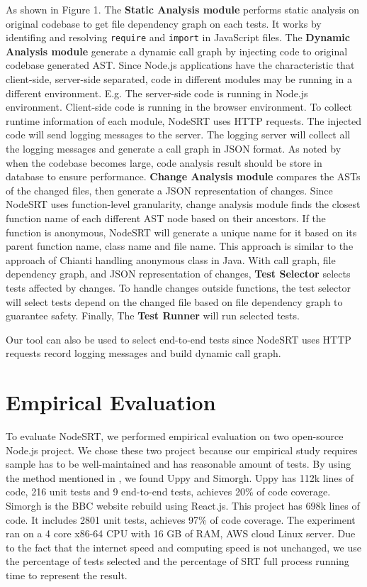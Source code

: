\documentclass[10pt, conference]{IEEEtran}
\begin{document}
As shown in Figure 1. The \textbf{Static Analysis module} performs static analysis on original codebase to get file dependency
graph on each tests. It works by identifing and resolving \verb|require| and \verb|import| in JavaScript files. The \textbf{Dynamic Analysis module} generate a dynamic call graph by injecting code to original codebase 
generated AST. Since Node.js applications have the characteristic that client-side, server-side separated, code in 
different modules may be running in a different environment. E.g. The server-side code is running in Node.js 
environment. Client-side code is running in the browser environment. To collect runtime information of each 
module, NodeSRT uses HTTP requests. The injected code will send logging messages to the server. The logging server will 
collect all the logging messages and generate a call graph in JSON format. As noted by \cite{b2, b4} when the codebase 
becomes large, code analysis result should be store in database to ensure performance. \textbf{Change Analysis module} 
compares the ASTs of the changed files, then generate a JSON representation of changes. Since NodeSRT uses function-level 
granularity, change analysis module finds the closest function name of each different AST node based on their ancestors. 
If the function is anonymous, NodeSRT will generate a unique name for it based on its parent function name, class name and file name. 
This approach is similar to the approach of Chianti \cite{b12} handling anonymous class in Java. With call graph, file dependency graph, 
and JSON representation of changes, \textbf{Test Selector} selects tests affected by changes. To handle changes outside 
functions, the test selector will select tests depend on the changed file based on file dependency graph to guarantee safety. 
Finally, The \textbf{Test Runner} will run selected tests.

Our tool can also be used to select end-to-end tests since NodeSRT uses HTTP requests 
record logging messages and build dynamic call graph.

\section{Empirical Evaluation}

To evaluate NodeSRT, we performed empirical evaluation on two open-source Node.js project. We chose these two project because 
our empirical study requires sample has to be well-maintained and has reasonable amount of tests. By using the method mentioned in \cite{b10}, 
we found Uppy and Simorgh. Uppy has 112k lines of code, 216 unit tests and 9 end-to-end tests, 
achieves 20\% of code coverage. Simorgh is the BBC website rebuild using React.js. This project has 698k lines of code. 
It includes 2801 unit tests, achieves 97\% of code coverage. The 
experiment ran on a 4 core x86-64 CPU with 16 GB of RAM, AWS cloud Linux server. Due to the fact that the internet speed and computing speed is not 
unchanged, we use the percentage of tests selected and the percentage of SRT full process running time to 
represent the result. 
\end{document}
